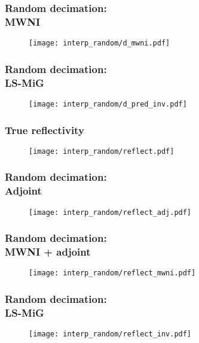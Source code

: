 \begin{frame}
\frametitle{Random decimation:\\MWNI}
\begin{figure} 
\texttt{[image: interp\_random/d\_mwni.pdf]} \\
\end{figure} 
\end{frame}

\begin{frame}
\frametitle{Random decimation:\\LS-MiG}
\begin{figure} 
\texttt{[image: interp\_random/d\_pred\_inv.pdf]} \\
\end{figure} 
\end{frame}

\begin{frame}
\frametitle{True reflectivity\\ }
\begin{figure} 
\texttt{[image: interp\_random/reflect.pdf]} \\
\end{figure} 
\end{frame}

\begin{frame}
\frametitle{Random decimation:\\Adjoint}
\begin{figure} 
\texttt{[image: interp\_random/reflect\_adj.pdf]} \\
\end{figure} 
\end{frame}

\begin{frame}
\frametitle{Random decimation:\\MWNI + adjoint}
\begin{figure} 
\texttt{[image: interp\_random/reflect\_mwni.pdf]} \\
\end{figure} 
\end{frame}

\begin{frame}
\frametitle{Random decimation:\\LS-MiG}
\begin{figure} 
\texttt{[image: interp\_random/reflect\_inv.pdf]} \\
\end{figure} 
\end{frame}

